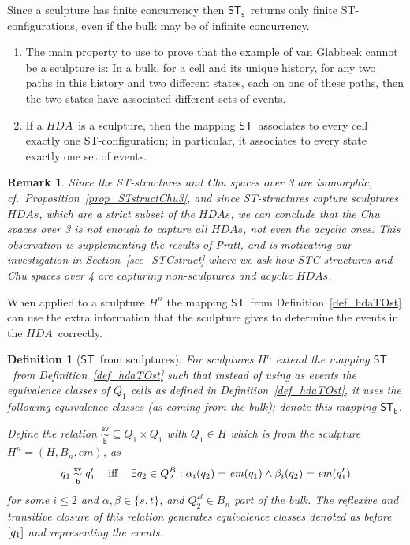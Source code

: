 \documentclass[submission,copyright,creativecommons]{eptcs}
\newtheorem{definition}[theorem]{Definition}
\newtheorem{remark}[theorem]{Remark}
\newcommand{\cp}[1]{}
\newcommand\HDA{\ensuremath{\mathit{HDA}}}
\newcommand\HDAs{\ensuremath{\mathit{HDAs}}}
\newcommand\hintost{\ensuremath{\mathsf{ST}}}
\newcommand\sculpintost{\ensuremath{\mathsf{ST}_{\!\mathsf{s}}}}
\newcommand\hintostScultures{\ensuremath{\mathsf{ST}_{\!\mathsf{b}}}}
\newcommand\sculpture[2]{\ensuremath{#1^{#2}}}
\newcommand\embedMorphism{\ensuremath{\mathit{em}}}
\newcommand\eventEquivHDAsculpture{\ensuremath{\overset{\mathsf{ev}}{\underset{\mathsf{b}}{\sim}}}}
\newcommand{\equivClass}[2][]{\ensuremath{[#2]\ifthenelse{\equal{#1}{}}{}{_{#1}}}}
\begin{document}
Since a sculpture has finite concurrency then \sculpintost\ returns only finite ST-configurations, even if the bulk may be of infinite concurrency.

\cp{Prove the next!}
\begin{enumerate}
\item The main property to use to prove that the example of van Glabbeek cannot be a sculpture is: In a bulk, for a cell and its unique history, for any two paths in this history and two different states, each on one of these paths, then the two states have associated different sets of events.

\item If a \HDA\ is a sculpture, then the mapping \hintost\ associates to every cell exactly one ST-configuration; in particular, it associates to every state exactly one set of events.

\end{enumerate}



\begin{remark}
Since the ST-structures and Chu spaces over 3 are isomorphic, cf.~Proposition~\ref{prop_STstructChu3}, and since ST-structures capture sculptures \HDAs, which are a strict subset of the \HDAs, we can conclude that the Chu spaces over 3 is not enough to capture all \HDAs, not even the acyclic ones. This observation is supplementing the results of Pratt, and is motivating our investigation in Section~\ref{sec_STCstruct} where we ask how STC-structures and Chu spaces over 4 are capturing non-sculptures and acyclic \HDAs.
\end{remark}

When applied to a sculpture $\sculpture{H}{n}$ the mapping \hintost\ from Definition~\ref{def_hdaTOst} can use the extra information that the sculpture gives to determine the events in the \HDA\ correctly.

\begin{definition}[\hintost\ from sculptures]\label{def_hdaTOst_sculptures}
For sculptures $\sculpture{H}{n}$ extend the mapping \hintost\ from Definition~\ref{def_hdaTOst} such that instead of using as events the equivalence classes of $Q_{1}$ cells as defined in Definition~\ref{def_hdaTOst}, it uses the following equivalence classes (as coming from the bulk); denote this mapping \hintostScultures.

Define the relation $\eventEquivHDAsculpture\subseteq Q_{1}\times Q_{1}$ with $Q_{1}\in H$ which is from the sculpture $\sculpture{H}{n}=(H,B_{n},\embedMorphism)$, as 
\[
q_{1}\eventEquivHDAsculpture q_{1}' \mbox{\hspace{2ex} iff \hspace{2ex}} \exists q_{2}\in Q^{B}_{2}:\alpha_{i}(q_{2})=\embedMorphism(q_{1})\wedge\beta_{i}(q_{2})=\embedMorphism(q_{1}')
\]
for some $i\leq 2$ and $\alpha,\beta\in\{s,t\}$, and $Q_{2}^{B}\in B_{n}$ part of the bulk. The reflexive and transitive closure of this relation generates equivalence classes denoted as before $\equivClass{q_{1}}$ and representing the \emph{events}.
\end{definition}
\end{document}

